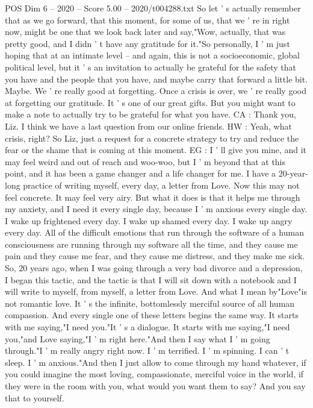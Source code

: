 \begin{textsample}{POS Dim 6 – 2020 – Score 5.00 – 2020/t004288.txt}
So let ' s actually remember that as we go forward, that this moment, for some of us, that we ' re in right now, might be one that we look back later and say,"Wow, actually, that was pretty good, and I didn ' t have any gratitude for it."So personally, I ' m just hoping that at an intimate level -- and again, this is not a socioeconomic, global political level, but it ' s an invitation to actually be grateful for the safety that you have and the people that you have, and maybe carry that forward a little bit.
Maybe.
We ' re really good at forgetting.
Once a crisis is over, we ' re really good at forgetting our gratitude.
It ' s one of our great gifts.
But you might want to make a note to actually try to be grateful for what you have.
CA : Thank you, Liz.
I think we have a last question from our online friends.
HW : Yeah, what crisis, right?
So Liz, just a request for a concrete strategy to try and reduce the fear or the shame that is coming at this moment.
EG : I ' ll give you mine, and it may feel weird and out of reach and woo-woo, but I ' m beyond that at this point, and it has been a game changer and a life changer for me.
I have a 20-year-long practice of writing myself, every day, a letter from Love.
Now this may not feel concrete.
It may feel very airy.
But what it does is that it helps me through my anxiety, and I need it every single day, because I ' m anxious every single day.
I wake up frightened every day.
I wake up shamed every day.
I wake up angry every day.
All of the difficult emotions that run through the software of a human consciousness are running through my software all the time, and they cause me pain and they cause me fear, and they cause me distress, and they make me sick.
So, 20 years ago, when I was going through a very bad divorce and a depression, I began this tactic, and the tactic is that I will sit down with a notebook and I will write to myself, from myself, a letter from Love.
And what I mean by"Love"is not romantic love.
It ' s the infinite, bottomlessly merciful source of all human compassion.
And every single one of these letters begins the same way.
It starts with me saying,"I need you."It ' s a dialogue.
It starts with me saying,"I need you,"and Love saying,"I ' m right here."And then I say what I ' m going through."I ' m really angry right now.
I ' m terrified.
I ' m spinning.
I can ' t sleep.
I ' m anxious."And then I just allow to come through my hand whatever, if you could imagine the most loving, compassionate, merciful voice in the world, if they were in the room with you, what would you want them to say?
And you say that to yourself.

\end{textsample}
